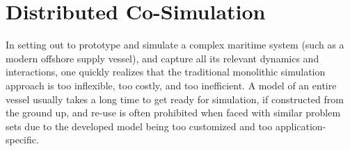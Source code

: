 \documentclass[prb,aps,showpacs,floatfix,twocolumn,10pt]{revtex4-1}
\theoremstyle{plain}
\theoremstyle{remark}
\begin{document}

\section{Distributed Co-Simulation}
\label{sec:cosimulation}

In setting out to prototype and simulate a complex maritime system (such as a modern offshore supply vessel), and capture all its relevant dynamics and interactions, one quickly realizes that the traditional monolithic simulation approach is too inflexible, too costly, and too inefficient.
A model of an entire vessel usually takes a long time to get ready for simulation, if constructed from the ground up, and re-use is often prohibited when faced with similar problem sets due to the developed model being too customized and too application-specific.
\end{document}
